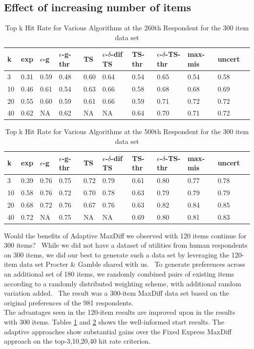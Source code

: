 \documentclass[nonblindrev]{informs3}
\newcommand{\fixedexpressS}{\textbf{exp}}
\newcommand{\egreedyS}{$\epsilon$-\textbf{g}}
\newcommand{\egreedythresS}{$\epsilon$-\textbf{g-thr}}
\newcommand{\misminS}{\textbf{max-mis}}
\newcommand{\tsS}{\textbf{TS} }
\newcommand{\edtsS}{$\epsilon$-$\delta$-\textbf{dif TS} }
\newcommand{\tsthresS}{\textbf{TS-thr} }
\newcommand{\edtsthresS}{$\epsilon$-$\delta$-\textbf{TS-thr} }
\newcommand{\uncertS}{\textbf{uncert} }
\begin{document}
\subsection{Effect of increasing number of items}
\begin{table}
\begin{center}
\begin{tabular}{lllllllllll}
\hline   k &  \fixedexpressS & \egreedyS&\egreedythresS&\tsS&\edtsS&\tsthresS&\edtsthresS& \misminS& \uncertS \\ \hline 
3&   0.31 &   0.59 & 0.48 & 0.60 &  0.64 & 0.54 & 0.65 & 0.54 &   0.58 \\ 
10 & 0.46 &   0.61 & 0.54 & 0.63  & 0.66 & 0.58 & 0.68 & 0.68  &   0.69 \\ 
20 & 0.55 &   0.60 & 0.59 &  0.61 & 0.66 & 0.59 & 0.71 &       0.72 &   0.72\\ 
40 & 0.62 &   NA & 0.62 & NA &  NA & 0.64 & 0.70 & 0.71 & 0.72 \end{tabular}
\end{center}
\caption{Top k Hit Rate for Various Algorithms at the 260th Respondent for the 300 item data set}
\label{table:300at260}
\end{table}

\begin{table}
\begin{center}
\begin{tabular}{lllllllllll}
\hline   k &  \fixedexpressS & \egreedyS&\egreedythresS&\tsS&\edtsS&\tsthresS&\edtsthresS& \misminS& \uncertS  \\ \hline  
3 & 0.39 &  0.76 & 0.75 & 0.72 & 0.79 & 0.61 &  0.80 &  0.77 &0.78 \\
10 &  0.58 &   0.76 & 0.72 & 0.70 & 0.78 & 0.63 & 0.79 & 0.79 &   0.79\\
20 & 0.68 & 0.72 & 0.76 & 0.67 & 0.76 &  0.63 & 0.82 & 0.84 &    0.85 \\ 
40 & 0.72 &   NA & 0.75 & NA & NA & 0.69 & 0.80 &0.81 & 0.83 \end{tabular}
\end{center}
\caption{Top k Hit Rate for Various Algorithms at the 500th Respondent for the 300 item data set}
\label{table:300at500}
\end{table}
Would the benefits of Adaptive MaxDiff we observed with 120 items continue for 300 items?  While we did not have a dataset of utilities from human respondents on 300 items, we did our best to generate such a data set by leveraging the 120-item data set Procter \& Gamble shared with us.  To generate preferences across an additional set of 180 items, we randomly combined pairs of existing items according to a randomly distributed weighting scheme, with additional random variation added.  The result was a 300-item MaxDiff data set based on the original preferences of the 981 respondents.\\
The advantages seen in the 120-item results are improved upon in the results with 300 items. Tables \ref{table:300at260} and \ref{table:300at500} shows the well-informed start results. The adaptive approaches show substantial gains over the Fixed Express MaxDiff approach on the top-3,10,20,40 hit rate criterion.\\
\end{document}

